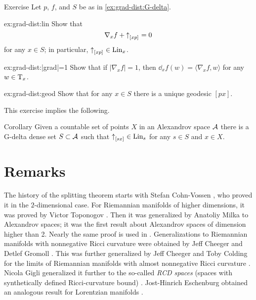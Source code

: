 \begin{thm}[!]{Exercise}\label{ex:grad-dist}
Let $p$, $f$, and $S$ be as in \ref{ex:grad-dist:G-delta}.

\begin{subthm}{ex:grad-dist:lin}
Show that 
\[\nabla_xf+{\uparrow}_{[{x}{p}]_{{}}}=0\]
for any 
$x\in S$;
in particular, ${\uparrow}_{[{x}{p}]_{{}}}\in \mathop{\rm Lin}\nolimits_x$.
\end{subthm}

\begin{subthm}{ex:grad-dist:|grad|=1}
Show that if $|\nabla_xf|=1$, then $\dd_xf(w)= \langle\nabla_xf,w\rangle$ for any $w\in \mathrm{T}_x$.
\end{subthm}

\begin{subthm}{ex:grad-dist:geod}
Show that for any $x\in S$ there is a unique geodesic $[px]$.
\end{subthm}

\end{thm}

This exercise implies the following.

\begin{thm}{Corollary}\label{cor:euclid-subcone}
Given a countable set of points $X$ in an Alexandrov space $\mathcal{A}$
there is a G-delta dense set $S\subset\mathcal{A}$
such that 
${\uparrow}_{[{s}{x}]_{{}}}\in \mathop{\rm Lin}\nolimits_s$
for any $s\in S$ and $x\in X$.
\end{thm}

\section{Remarks}

The history of the splitting theorem starts with Stefan Cohn-Vossen \cite{cohn-vossen_line},
who proved it in the $2$-dimensional case.
For Riemannian manifolds of higher dimensions,
it was proved by Victor Toponogov \cite{toponogov-globalization+splitting}.
Then it was generalized by Anatoliy Milka \cite{milka-line}
to Alexandrov spaces;
it was the first result about Alexandrov spaces of dimension higher than 2.
Nearly the same proof is used in \cite[1.5]{burago-burago-ivanov}.
Generalizations to Riemannian manifolds with nonnegative Ricci curvature were obtained by Jeff Cheeger and Detlef Gromoll \cite{cheeger-gromoll-split}.
This was further generalized by Jeff Cheeger and Toby Colding for the limits of Riemannian manifolds with almost nonnegative Ricci curvature \cite{cheeger-colding-alm-rigidity}.
Nicola Gigli generalized it further to the so-called {}\emph{RCD spaces} (spaces with synthetically defined Ricci-curvature bound) \cite{gigli2013splitting, gigli-splitting-overview}.
Jost-Hinrich Eschenburg obtained an analogous result for Lorentzian manifolds \cite{eshenburg-split}.

